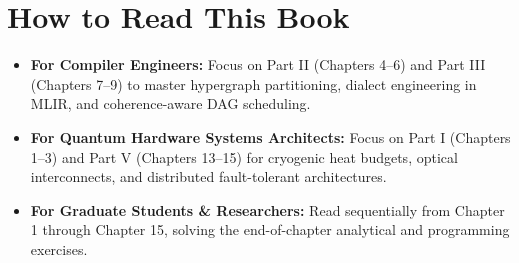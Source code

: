 \section*{How to Read This Book}
\begin{itemize}
    \item \textbf{For Compiler Engineers:} Focus on Part II (Chapters 4--6) and Part III (Chapters 7--9) to master hypergraph partitioning, dialect engineering in MLIR, and coherence-aware DAG scheduling.
    \item \textbf{For Quantum Hardware Systems Architects:} Focus on Part I (Chapters 1--3) and Part V (Chapters 13--15) for cryogenic heat budgets, optical interconnects, and distributed fault-tolerant architectures.
    \item \textbf{For Graduate Students \& Researchers:} Read sequentially from Chapter 1 through Chapter 15, solving the end-of-chapter analytical and programming exercises.
\end{itemize}

